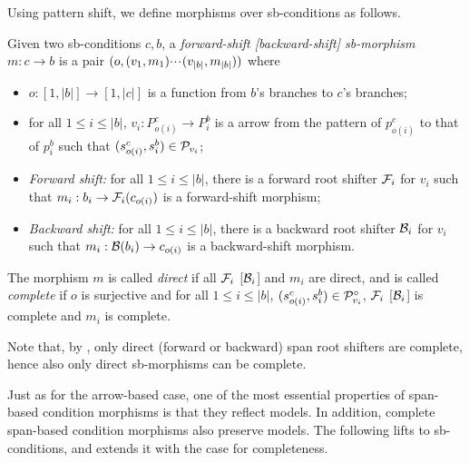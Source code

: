 Using pattern shift, we define morphisms over sb-conditions as follows.
%
\begin{definition}\label{def:sb-morphism}
  Given two sb-conditions $c,b$, a \emph{forward-shift [backward-shift] sb-morphism} $m:c\to b$ is a pair $(o,(v_1,m_1){\cdotp\mkern-2mu\cdotp\mkern-2mu\cdotp\mkern1mu} (v_{|b|},m_{|b|}))$ where
  \begin{itemize}[topsep=\smallskipamount]
  \item $o:[1,|b|]\to [1,|c|]$ is a function from $b$'s branches to $c$'s branches;
  \item for all $1\leq i\leq |b|$, $v_i:P^c_{o(i)}\to P^b_i$ is a arrow from the pattern of $p^c_{o(i)}$ to that of $p^b_i$ such that $(s^c_{o(i)},s^b_i)\in \mathcal{P}_{v_i}$;
  \item \emph{Forward shift:} for all $1\leq i\leq |b|$, there is a forward root shifter $\mathcal{F}_i$ for $v_i$ such that $m_i:b_i \rightarrow \mathcal{F}_i(c_{o(i)})$ is a forward-shift morphism;
  \item \emph{Backward shift:} for all $1\leq i\leq |b|$, there is a backward root shifter $\mathcal{B}_i$ for $v_i$ such that $m_i:\mathcal{B}(b_i) \rightarrow  c_{o(i)}$ is a backward-shift morphism.
  \end{itemize}
  The morphism $m$ is called \emph{direct} if all $\mathcal{F}_i$ [$\mathcal{B}_i$] and $m_i$ are direct, and is called \emph{complete} if $o$ is surjective and for all $1\leq i\leq |b|$, $(s^c_{o(i)},s^b_i)\in \mathcal{P}^\circ_{v_i}$, $\mathcal{F}_i$ [$\mathcal{B}_i$] is complete and $m_i$ is complete.
\end{definition}
%
Note that, by , only direct (forward or backward) span root shifters are complete, hence also only direct sb-morphisms can be complete.

Just as for the arrow-based case, one of the most essential properties of span-based condition morphisms is that they reflect models. In addition, complete span-based condition morphisms also preserve models. The following lifts  to sb-conditions, and extends it with the case for completeness.

